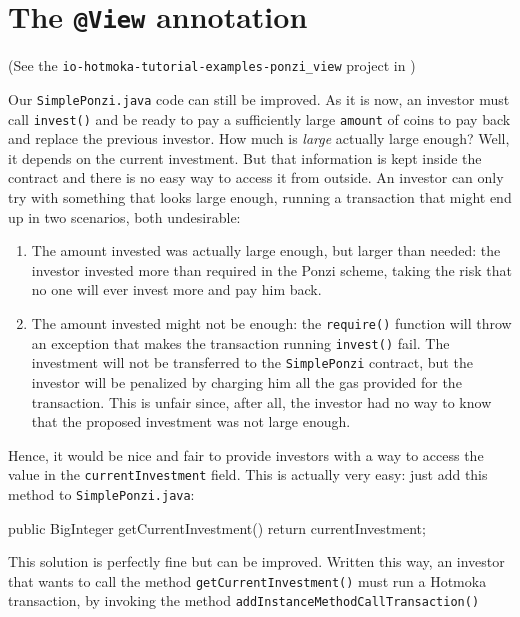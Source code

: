 \section{The \texttt{@View} annotation}\label{sec:view_annotation}

\begin{center}
(See the \texttt{io-hotmoka-tutorial-examples-ponzi\_view} project in \hotmokaRepo{})
\end{center}

Our \texttt{SimplePonzi.java} code can still be improved. As it is now,
an investor must call \texttt{invest()} and be ready to pay a sufficiently
large \texttt{amount} of coins to pay back and replace the previous investor.
How much is \emph{large} actually large enough? Well, it depends on the
current investment. But that information is kept inside the contract
and there is no easy way to access it from outside.
An investor can only try with something that looks large enough,
running a transaction that might end up in two scenarios,
both undesirable:
%
\begin{enumerate}
\item The amount invested was actually large enough, but larger than needed: the investor
  invested more than required in the Ponzi scheme, taking the risk that no one
  will ever invest more and pay him back.
\item The amount invested might not be enough: the \texttt{require()} function
  will throw an exception that makes the transaction running \texttt{invest()} fail.
  The investment will not be transferred to the \texttt{SimplePonzi} contract, but
  the investor will be penalized by charging him all the gas provided for
  the transaction. This is unfair since, after all, the investor had no
  way to know that the proposed investment was not large enough.
\end{enumerate}
%
Hence, it would be nice and fair to provide investors with a way to access
the value in the \texttt{currentInvestment} field.
This is actually very easy: just add this method to \texttt{SimplePonzi.java}:
%
\begin{codebox}\begin{javalst}
public BigInteger getCurrentInvestment() {
  return currentInvestment;
}
\end{javalst}\end{codebox}
%
This solution is perfectly fine but can be improved. Written this way,
an investor that wants to call the method \texttt{getCurrentInvestment()} must run a
Hotmoka transaction, by invoking the method \texttt{addInstanceMethodCallTransaction()}
